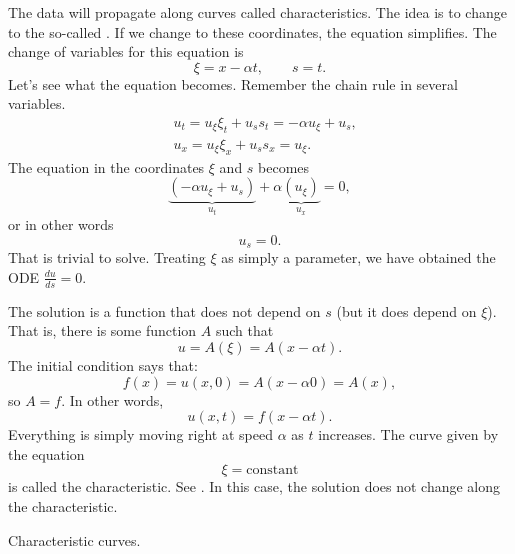 \documentclass{ximera}
\begin{document}
\begin{exampleSol}
    The data will propagate along curves called characteristics.  The idea is to change to the so-called \emph{}.  If we change to these coordinates, the equation simplifies.  The change of variables for this equation is
    \begin{equation*}
        \xi = x - \alpha t ,  \qquad s = t .
    \end{equation*}
    Let's see what the equation becomes. Remember the chain rule in several variables.
    \begin{align*}
        & u_t = u_\xi \xi_t + u_s s_t = - \alpha u_\xi + u_s , \\
        & u_x = u_\xi \xi_x + u_s s_x = u_\xi .
    \end{align*}
    The equation in the coordinates $\xi$ and $s$ becomes
    \begin{equation*}
        \underbrace{(- \alpha u_\xi + u_s)}_{u_t} + \alpha \underbrace{(u_\xi)}_{u_x} = 0 ,
    \end{equation*}
    or in other words
    \begin{equation*}
        u_s = 0 .
    \end{equation*}
    That is trivial to solve.  Treating $\xi$ as simply a parameter, we have obtained the ODE $\frac{d u}{d s} = 0$.
    
    The solution is a function that does not depend on $s$ (but it does depend on $\xi$). That is, there is some function $A$ such that
    \begin{equation*}
        u = A(\xi) = A(x - \alpha t) .
    \end{equation*}
    The initial condition says that:
    \begin{equation*}
        f(x) = u(x,0) = A(x - \alpha 0) = A(x) ,
    \end{equation*}
    so $A=f$.  In other words,
    \begin{equation*}
        u(x,t) = f(x-\alpha t) .
    \end{equation*}
    Everything is simply moving right at speed $\alpha$ as $t$ increases. The curve given by the equation
    \begin{equation*}
        \xi = \text{constant}
    \end{equation*}
    is called the characteristic. See . In this case, the solution does not change along the characteristic.
    
    \begin{mywrapfig}{2.8in}
        \capstart
        
        \caption{Characteristic curves.\label{fopde:charcurves}}
    \end{mywrapfig}
    

\end{exampleSol}
\end{document}
